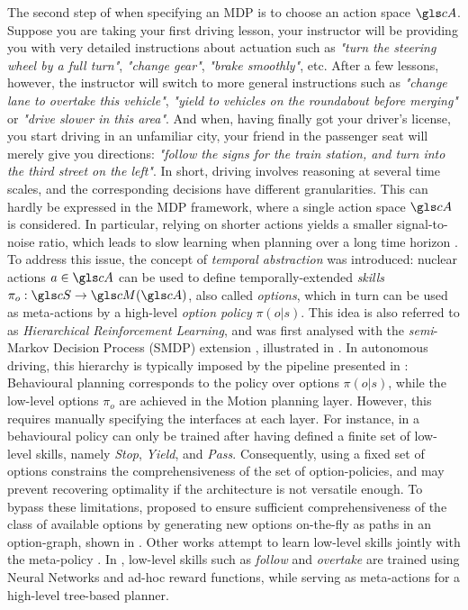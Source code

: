 The second step of when specifying an MDP is to choose an action space $\cA$. Suppose you are taking your first driving lesson, your instructor will be providing you with very detailed instructions about actuation such as \emph{"turn the steering wheel by a full turn"}, \emph{"change gear"}, \emph{"brake smoothly"}, etc. After a few lessons, however, the instructor will switch to more general instructions such as \emph{"change lane to overtake this vehicle"}, \emph{"yield to vehicles on the roundabout before merging"} or \emph{"drive slower in this area"}. And when, having finally got your driver's license, you start driving in an unfamiliar city, your friend in the passenger seat will merely give you directions: \emph{"follow the signs for the train station, and turn into the third street on the left"}. In short, driving involves reasoning at several time scales, and the corresponding decisions have different granularities. This can hardly be expressed in the MDP framework, where a single action space $\cA$ is considered. In particular, relying on shorter actions yields a smaller signal-to-noise ratio, which leads to slow learning when planning over a long time horizon \citep{ShalevShwartz2017}. To address this issue, the concept of \emph{temporal abstraction} was introduced: nuclear actions $a\in\cA$ can be used to define temporally-extended \emph{skills} $\pi_o:\cS \rightarrow \cM(\cA)$, also called \emph{options}, which in turn can be used as meta-actions by a high-level \emph{option policy} $\pi(o|s)$. This idea is also referred to as \emph{Hierarchical Reinforcement Learning}, and was first analysed with the \emph{semi}-Markov Decision Process (SMDP) extension \citep{Sutton1999}, illustrated in . In autonomous driving, this hierarchy is typically imposed by the pipeline presented in : Behavioural planning corresponds to the policy over options $\pi(o|s)$, while the low-level options $\pi_o$ are achieved in the Motion planning layer. However, this requires manually specifying the interfaces at each layer. For instance, in \citep{Barbier2018} a behavioural policy can only be trained after having defined a finite set of low-level skills, namely \emph{Stop}, \emph{Yield}, and \emph{Pass}. Consequently, using a fixed set of options constrains the comprehensiveness of the set of option-policies, and may prevent recovering optimality if the architecture is not versatile enough. To bypass these limitations, \citet{ShalevShwartz2016} proposed to ensure sufficient comprehensiveness of the class of available options by generating new options on-the-fly as paths in an option-graph, shown in . Other works attempt to learn low-level skills jointly with the meta-policy \citep{Bacon2017,Vezhnevets2017,Heess2016}. In \citep{Paxton2017}, low-level skills such as \emph{follow} and \emph{overtake} are trained using Neural Networks and ad-hoc reward functions, while serving as meta-actions for a high-level tree-based planner.

